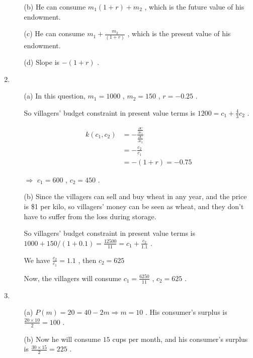 \documentclass{article}
\begin{document}
\begin{enumerate}
\begin{enumerate}
        \item[(b)] He can consume $m_1(1+r)+m_2$ , which is the future value of his endowment.
        \item[(c)] He can consume $m_1+\frac{m_2}{(1+r)}$ , which is the present value of his endowment.
        \item[(d)] Slope is $-(1+r)$ .
    \end{enumerate}
    \item \begin{enumerate}
        \item[(a)] In this question, $m_1=1000$ , $m_2=150$ , $r=-0.25$ . \par
        So villagers' budget constraint in present value terms is $1200=c_1+\frac{4}{3}c_2$ . \par
        \begin{equation}
            \begin{aligned}
                k(c_1,c_2)
                &=-\frac{\frac{\partial U}{\partial c_1}}{\frac{\partial U}{\partial c_2}} \\
                &=-\frac{c_2}{c_1} \\
                &=-(1+r)=-0.75
            \end{aligned}
            \nonumber
        \end{equation} \par
        $\Rightarrow$ $c_1=600$ , $c_2=450$ .
        \item[(b)] Since the villagers can sell and buy wheat in any year, 
        and the price is \$1 per kilo, so villagers' money can be seen as wheat, and they don't have to suffer from the loss during storage. \par
        So villagers' budget constraint in present value terms is $1000+150/(1+0.1)=\frac{12500}{11}=c_1+\frac{c_2}{1.1}$ . \par
        We have $\frac{c_2}{c_1}=1.1$ , then $c_2=625$  \par
        Now, the villagers will consume $c_1=\frac{6250}{11}$ , $c_2=625$ .
    \end{enumerate}
    \item \begin{enumerate}
        \item[(a)] $P(m)=20=40-2m\Rightarrow m=10$ . His consumer's surplus is $\frac{20\times10}{2}=100$ . 
        \item[(b)] Now he will consume $15$ cups per month, and his consumer's surplus is $\frac{30\times15}{2}=225$ . \par

\end{enumerate}
\end{enumerate}
\end{document}
